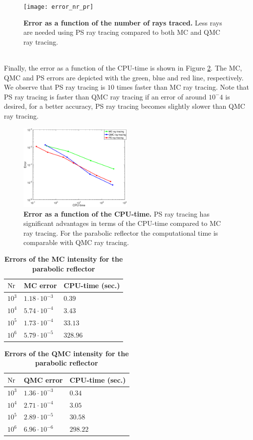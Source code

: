 \begin{figure}[h!]
  \center
  \texttt{[image: error\_nr\_pr]}
  \caption{\textbf{Error as a function of the number of rays traced.} Less rays are needed using PS ray tracing compared to both MC and QMC ray tracing.}
  \label{fig:error_rays_pr}
\end{figure} 
\\ \indent
Finally, the error as a function of the CPU-time is shown in Figure \ref{fig:error_time_pr}. The MC, QMC and PS errors are depicted with the green, blue and red line, respectively. We observe that PS ray tracing is $10$ times faster than MC ray tracing. Note that PS ray tracing is faster than QMC ray tracing if an error of around $10^-4$ is desired, for a better accuracy, PS ray tracing becomes slightly slower than QMC ray tracing.
\begin{figure}[h!]
  \center
  \includegraphics[width = 0.5\textwidth]{error_time_pr}
  \caption{\textbf{Error as a function of the CPU-time.} PS ray tracing has significant advantages in terms of the CPU-time compared to MC ray tracing. For the parabolic reflector the computational time is comparable with QMC ray tracing.}
  \label{fig:error_time_pr}
\end{figure} 
\begin{table}[ht] 
\centering
\caption{\bf Errors of the MC intensity for the parabolic reflector}
\begin{tabular}{lll}
 \hline   $\textrm{Nr}$ & MC error & CPU-time (sec.) \\
  \hline 
 $10^3$     & $1.18\cdot10^{-3}$ & $0.39$\\
 $10^4$     & $5.74\cdot 10^{-4}$ & $3.43$ \\
 $10^5$     & $1.73\cdot 10^{-4}$ & $33.13$\\
 $10^6$     & $5.79\cdot 10^{-5}$ & $328.96$\\
 \hline
 \end{tabular}
 \label{tab:MC_error_triangulation}
 \end{table}
\begin{table}[ht] 
\centering
\caption{\bf Errors of the QMC intensity for the parabolic reflector}
\begin{tabular}{lll}
 \hline   $\textrm{Nr}$ & QMC error & CPU-time (sec.) \\
  \hline 
 $10^3$     & $1.36\cdot10^{-3}$ & $0.34$\\
 $10^4$     & $2.71\cdot 10^{-4}$ & $3.05$ \\
 $10^5$     & $2.89\cdot 10^{-5}$ & $30.58$\\
 $10^6$     & $6.96\cdot 10^{-6}$ & $298.22$\\
 \hline
 \end{tabular}
 \label{tab:QMC_error_triangulation}
 \end{table}
